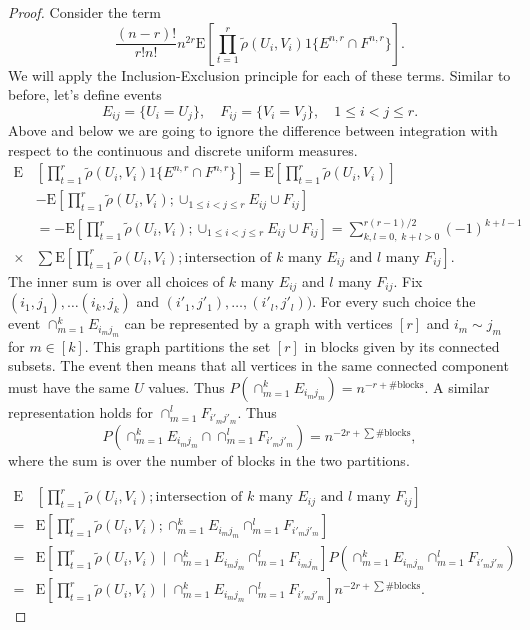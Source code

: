 \documentclass[10pt,a4paper]{amsart}
\newcommand{\E}{\mathrm{E}}
\begin{document}
\begin{proof}
Consider the term 
\[
\frac{(n-r)!}{r! n!} n^{2r} \E\left[ \prod_{t=1}^r \tilde{\rho}(U_i, V_i) 1\{ E^{n,r} \cap F^{n,r}\} \right].
\]
We will apply the Inclusion-Exclusion principle for each of these terms. Similar to before, let's define events 
\[
E_{ij}= \{U_i=U_j\}, \quad F_{ij}=\{V_i = V_j\}, \quad 1\le i < j \le r.
\]
Above and below we are going to ignore the difference between integration with respect to the  continuous and discrete uniform measures. 
\[
\begin{split}
    \E&\left[ \prod_{t=1}^r \tilde{\rho}(U_i, V_i) 1\{ E^{n,r} \cap F^{n,r}\} \right]= \E\left[ \prod_{t=1}^r \tilde{\rho}(U_i, V_i) \right]\\
    &- \E\left[ \prod_{t=1}^r \tilde{\rho}(U_i, V_i); \cup_{1\le i < j \le r} E_{ij} \cup F_{ij} \right]\\
    &= - \E\left[ \prod_{t=1}^r \tilde{\rho}(U_i, V_i); \cup_{1\le i < j \le r} E_{ij} \cup F_{ij} \right]=\sum_{k,l=0,\; k+l>0}^{r(r-1)/2} (-1)^{k+l-1} \\
    \times &\sum \E\left[ \prod_{t=1}^r \tilde{\rho}(U_i, V_i); \text{intersection of $k$ many $E_{ij}$ and $l$ many $F_{ij}$}  \right].
\end{split}
\]
The inner sum is over all choices of $k$ many $E_{ij}$ and $l$ many $F_{ij}$. Fix $(i_1, j_1), \ldots (i_k, j_k)$ and $(i'_1, j'_1), \ldots, (i'_l, j'_l))$. For every such choice the event $\cap_{m=1}^k E_{i_mj_m}$ can be represented by a graph with vertices $[r]$ and $i_m \sim j_m$ for $m\in [k]$. This graph partitions the set $[r]$ in blocks given by its connected subsets. The event then means that all vertices in the same connected component must have the same $U$ values. Thus $P(\cap_{m=1}^k E_{i_mj_m})= n^{-r + \#\text{blocks}}$. A similar representation holds for $\cap_{m=1}^l F_{i'_mj'_m}$. Thus 
\[
P\left(\cap_{m=1}^k E_{i_mj_m} \cap \cap_{m=1}^l F_{i'_mj'_m} \right)= n^{-2r + \sum \#\text{blocks}},
\]
where the sum is over the number of blocks in the two partitions. 





\[
\begin{split}
\E&\left[ \prod_{t=1}^r \tilde{\rho}(U_i, V_i); \text{intersection of $k$ many $E_{ij}$ and $l$ many $F_{ij}$}  \right]\\
=&\E\left[ \prod_{t=1}^r \tilde{\rho}(U_i, V_i);  \cap_{m=1}^k E_{i_mj_m} \cap_{m=1}^l F_{i'_mj'_m} \right] \\
=& \E\left[ \prod_{t=1}^r \tilde{\rho}(U_i, V_i) \mid   \cap_{m=1}^k E_{i_mj_m} \cap_{m=1}^l F_{i_mj_m} \right] P\left( \cap_{m=1}^k E_{i_mj_m} \cap_{m=1}^l F_{i'_mj'_m} \right)\\
=& \E\left[ \prod_{t=1}^r \tilde{\rho}(U_i, V_i) \mid   \cap_{m=1}^k E_{i_mj_m} \cap_{m=1}^l F_{i'_mj'_m} \right] n^{-2r + \sum \#\text{blocks}}.
\end{split}
\]


\end{proof}
\end{document}
